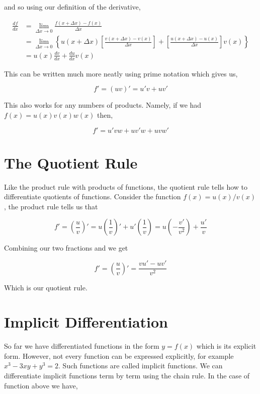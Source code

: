 and so using our definition of the derivative,

\begin{align*}
    \frac{df}{dx} &= \lim_{\Delta x \to 0} \frac{f(x + \Delta x) - f(x)}{\Delta x}\\
    &= \lim_{\Delta x \to 0} \left\{u(x + \Delta x)\left[\frac{v(x + \Delta x) - v(x)}{\Delta x}\right] + \left[\frac{u(x + \Delta x) - u(x)}{\Delta x}\right]v(x)\right\}\\
    &= u(x)\frac{dv}{dx} + \frac{du}{dx}v(x)
\end{align*}

This can be written much more neatly using prime notation which gives us,

\begin{equation*}
    f' = (uv)' = u' v + uv'
\end{equation*}

This also works for any numbers of products. Namely, if we had $f(x) = u(x)v(x)w(x)$ then,

\begin{equation*}
    f' = u'vw + uv'w + uvw'
\end{equation*}

\section{The Quotient Rule}

Like the product rule with products of functions, the quotient rule tells how to differentiate 
quotients of functions. Consider the function $f(x) = u(x)/v(x)$, the product rule tells us that

\begin{equation*}
    f' = \left(\frac{u}{v}\right)' = u\left(\frac{1}{v}\right)' + u'\left(\frac{1}{v}\right) = u\left(-\frac{v'}{v^2}\right) + \frac{u'}{v}
\end{equation*}

Combining our two fractions and we get

\begin{equation*}
    f' = \left(\frac{u}{v}\right)' = \frac{vu' - uv'}{v^2}
\end{equation*}

Which is our quotient rule.

\section{Implicit Differentiation}

So far we have differentiated functions in the form $y = f(x)$ which is its explicit form.
However, not every function can be expressed explicitly, for example $x^3 - 3xy + y^3 = 2$. 
Such functions are called implicit functions. We can differentiate implicit functions term 
by term using the chain rule. In the case of function above we have,

